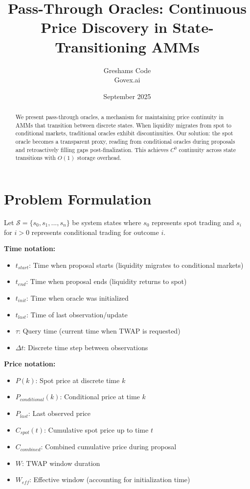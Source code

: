 \documentclass{article}
\title{Pass-Through Oracles: Continuous Price Discovery in State-Transitioning AMMs}
\author{Greshams Code\\Govex.ai}
\date{September 2025}
\begin{document}
\maketitle

\begin{abstract}
We present pass-through oracles, a mechanism for maintaining price continuity in AMMs that transition between discrete states. When liquidity migrates from spot to conditional markets, traditional oracles exhibit discontinuities. Our solution: the spot oracle becomes a transparent proxy, reading from conditional oracles during proposals and retroactively filling gaps post-finalization. This achieves $C^0$ continuity across state transitions with $O(1)$ storage overhead.
\end{abstract}

\section{Problem Formulation}

Let $\mathcal{S} = \{s_0, s_1, ..., s_n\}$ be system states where $s_0$ represents spot trading and $s_i$ for $i > 0$ represents conditional trading for outcome $i$.

\textbf{Time notation:}
\begin{itemize}
\item $t_{start}$: Time when proposal starts (liquidity migrates to conditional markets)
\item $t_{end}$: Time when proposal ends (liquidity returns to spot)
\item $t_{init}$: Time when oracle was initialized
\item $t_{last}$: Time of last observation/update
\item $\tau$: Query time (current time when TWAP is requested)
\item $\Delta t$: Discrete time step between observations
\end{itemize}

\textbf{Price notation:}
\begin{itemize}
\item $P(k)$: Spot price at discrete time $k$
\item $P_{conditional}(k)$: Conditional price at time $k$
\item $P_{last}$: Last observed price
\item $C_{spot}(t)$: Cumulative spot price up to time $t$
\item $C_{combined}$: Combined cumulative price during proposal
\item $W$: TWAP window duration
\item $W_{eff}$: Effective window (accounting for initialization time)
\end{itemize}
\end{document}
